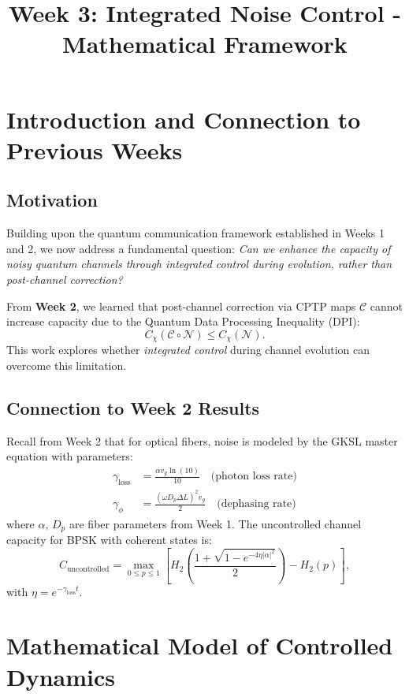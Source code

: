 \documentclass[11pt]{article}
\title{Week 3: Integrated Noise Control - Mathematical Framework}
\author{}
\date{}
\begin{document}
\maketitle

\section{Introduction and Connection to Previous Weeks}
\subsection{Motivation}
Building upon the quantum communication framework established in Weeks 1 and 2, we now address a fundamental question: \textit{Can we enhance the capacity of noisy quantum channels through integrated control during evolution, rather than post-channel correction?} 

From \textbf{Week 2}, we learned that post-channel correction via CPTP maps $\mathcal{C}$ cannot increase capacity due to the Quantum Data Processing Inequality (DPI):
\[
C_\chi(\mathcal{C}\circ\mathcal{N}) \leq C_\chi(\mathcal{N}).
\]
This work explores whether \textit{integrated control} during channel evolution can overcome this limitation.

\subsection{Connection to Week 2 Results}
Recall from Week 2 that for optical fibers, noise is modeled by the GKSL master equation with parameters:
\begin{align*}
\gamma_{\text{loss}} &= \frac{\alpha v_g \ln(10)}{10} \quad \text{(photon loss rate)} \\
\gamma_\phi &= \frac{(\omega D_p \Delta L)^2 v_g}{2} \quad \text{(dephasing rate)}
\end{align*}
where $\alpha$, $D_p$ are fiber parameters from Week 1. The uncontrolled channel capacity for BPSK with coherent states is:
\[
C_{\text{uncontrolled}} = \max_{0 \leq p \leq 1} \left[ H_2\left( \frac{1 + \sqrt{1 - e^{-4\eta|\alpha|^2}}}{2} \right) - H_2(p) \right],
\]
with $\eta = e^{-\gamma_{\text{loss}} t}$.

\section{Mathematical Model of Controlled Dynamics}
\end{document}
